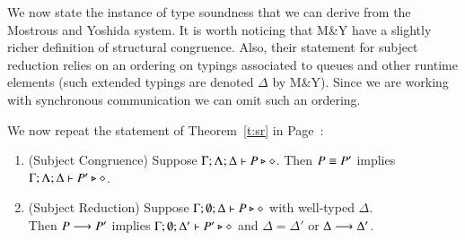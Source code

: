 We now state the instance of type soundness that we
can derive from the Mostrous and Yoshida system.
It is worth noticing that M\&Y have a slightly richer
definition of structural congruence.
Also, their statement for subject reduction relies on an 
ordering on typings associated to queues and other 
runtime elements (such extended typings are denoted $\Delta$ by M\&Y).
Since we are working with synchronous communication we can omit such an ordering.

We now repeat the statement of
Theorem~\ref{t:sr} in Page~\pageref{t:sr}:

\begin{theorem}%
	\begin{enumerate}[1.]
		\item	(Subject Congruence) Suppose $\Gamma; \Lambda; \Delta \vdash P \triangleright \diamond$.
			Then $P \equiv P'$ implies $\Gamma; \Lambda; \Delta \vdash P' \triangleright \diamond$.

		\item	(Subject Reduction) Suppose $\Gamma; \emptyset; \Delta \vdash P \triangleright \diamond$
			with
			well-typed $\Delta$. \\
			Then $P \longrightarrow P'$ implies $\Gamma; \emptyset; \Delta'  \vdash P' \triangleright \diamond$
			and $\Delta = \Delta'$ or $\Delta \longrightarrow \Delta'$.

	\end{enumerate}
\end{theorem}

